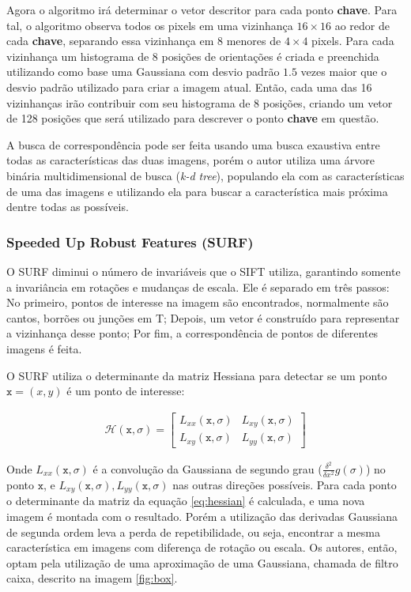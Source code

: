   Agora o algoritmo irá determinar o vetor descritor para cada ponto \textbf{chave}. Para tal, o algoritmo observa todos
os pixels em uma vizinhança $16 \times 16$ ao redor de cada \textbf{chave}, separando essa vizinhança em 8 menores de $4 \times 4$ pixels.
Para cada vizinhança um histograma de 8 posições de orientações é criada e preenchida utilizando como base uma Gaussiana
com desvio padrão $1.5$ vezes maior que o desvio padrão utilizado para criar a imagem atual. Então, cada uma das 16
vizinhanças irão contribuir com seu histograma de 8 posições, criando um vetor de 128 posições que será utilizado
para descrever o ponto \textbf{chave} em questão. 

  A busca de correspondência pode ser feita usando uma busca exaustiva entre todas as características das duas imagens,
porém o autor utiliza uma árvore binária multidimensional de busca (\textit{k-d tree}), populando ela com as 
características de uma das imagens e utilizando ela para buscar a característica mais próxima dentre todas as possíveis.

\subsubsection{Speeded Up Robust Features (SURF)}

  O SURF diminui o número de invariáveis que o SIFT utiliza, garantindo somente a invariância em rotações e mudanças de 
escala. Ele é separado em três passos: No primeiro, pontos de interesse na imagem são encontrados, normalmente são 
cantos, borrões ou junções em T; Depois, um vetor é construído para representar a vizinhança desse ponto; Por fim, a 
correspondência de pontos de diferentes imagens é feita.

  O SURF utiliza o determinante da matriz Hessiana para detectar se um ponto $\mathtt{x} = (x, y)$ é um ponto de 
interesse:

\begin{align}\label{eq:hessian}
    \mathcal{H}(\mathtt{x}, \sigma) = 
      \begin{bmatrix} 
        L_{xx}(\mathtt{x}, \sigma) & L_{xy}(\mathtt{x}, \sigma) \\
        L_{xy}(\mathtt{x}, \sigma) & L_{yy}(\mathtt{x}, \sigma)
      \end{bmatrix}
\end{align}

  Onde $L_{xx}(\mathtt{x}, \sigma)$ é a convolução da Gaussiana de segundo grau ($ \frac{\delta^2}{\delta x^2} g(\sigma) $) 
no ponto $\mathtt{x}$, e $L_{xy}(\mathtt{x}, \sigma), L_{yy}(\mathtt{x}, \sigma)$ nas outras direções possíveis. Para 
cada ponto o determinante da matriz da equação \ref{eq:hessian} é calculada, e uma nova imagem é montada com o resultado.
Porém a utilização das derivadas Gaussiana de segunda ordem leva a perda de repetibilidade, ou seja, encontrar a mesma 
característica em imagens com diferença de rotação ou escala. Os autores, então, optam pela utilização de uma aproximação 
de uma Gaussiana, chamada de filtro caixa, descrito na imagem \ref{fig:box}. 

